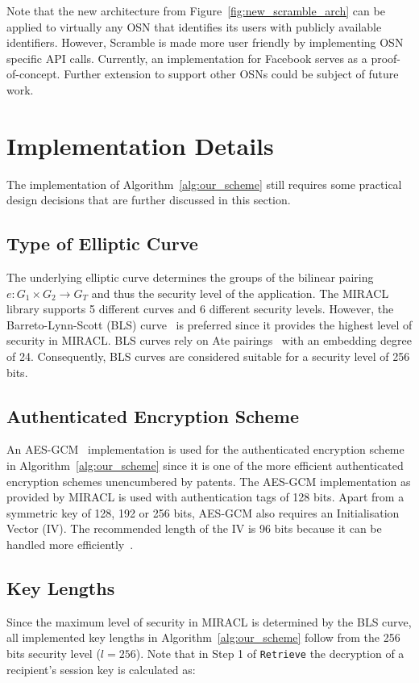 Note that the new architecture from Figure~\ref{fig:new_scramble_arch} can be applied to virtually any OSN that identifies its users with publicly available identifiers. However, Scramble is made more user friendly by implementing OSN specific API calls. Currently, an implementation for Facebook serves as a proof-of-concept. Further extension to support other OSNs could be subject of future work.


\section{Implementation Details}
\label{sec:implementation_details}
The implementation of Algorithm~\ref{alg:our_scheme} still requires some practical design decisions that are further discussed in this section.

\subsection{Type of Elliptic Curve}
The underlying elliptic curve determines the groups of the bilinear pairing $e: G_1 \times G_2 \rightarrow G_T$ and thus the security level of the application. The MIRACL library supports 5 different curves and 6 different security levels. However, the Barreto-Lynn-Scott (BLS) curve~\cite{art:BarretoLS02} is preferred since it provides the highest level of security in MIRACL. BLS curves rely on Ate pairings~\cite{art:HessSV06} with an embedding degree of 24. Consequently, BLS curves are considered suitable for a security level of 256 bits.

\subsection{Authenticated Encryption Scheme}
An AES-GCM~\cite{art:McGrewV04} implementation is used for the authenticated encryption scheme in Algorithm~\ref{alg:our_scheme} since it is one of the more efficient authenticated encryption schemes unencumbered by patents. The AES-GCM implementation as provided by MIRACL is used with authentication tags of 128 bits. Apart from a symmetric key of 128, 192 or 256 bits, AES-GCM also requires an Initialisation Vector (IV). The recommended length of the IV is 96 bits because it can be handled more efficiently~\cite{rfc5084}.

\subsection{Key Lengths}
Since the maximum level of security in MIRACL is determined by the BLS curve, all implemented key lengths in Algorithm~\ref{alg:our_scheme} follow from the 256 bits security level ($l=256$). Note that in Step 1 of \texttt{Retrieve} the decryption of a recipient's session key is calculated as: 

